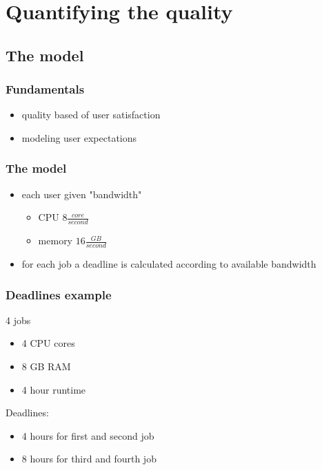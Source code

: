 \section{Quantifying the quality}
\subsection{The model}


\begin{frame}
	\frametitle{Fundamentals}
	\begin{itemize}
		\item quality based of user satisfaction
		\item modeling user expectations
	\end{itemize}
\end{frame}

\begin{frame}
	\frametitle{The model}
	\begin{itemize}
		\item each user given "bandwidth"
		\begin{itemize}
			\item CPU $8\frac{core}{second}$
			\item memory $16\frac{GB}{second}$
		\end{itemize}
		\item for each job a deadline is calculated according to available bandwidth
	\end{itemize}
\end{frame}

\begin{frame}
	\frametitle{Deadlines example}
	4 jobs
	\begin{itemize}
		\item 4 CPU cores
		\item 8 GB RAM
		\item 4 hour runtime
	\end{itemize}
	Deadlines:
	\begin{itemize}
		\item 4 hours for first and second job
		\item 8 hours for third and fourth job
	\end{itemize}
\end{frame}

